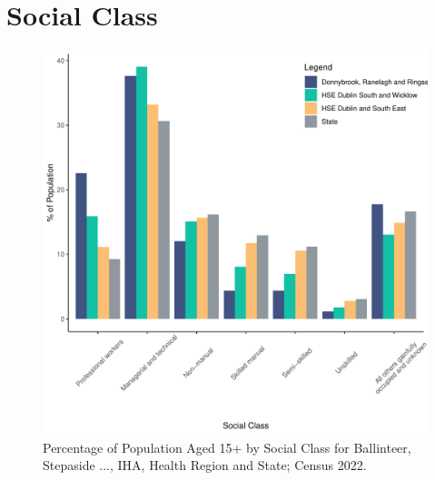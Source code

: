 \documentclass{article}
\begin{document}
\section{Social Class}\label{sect:SC}
\begin{figure}[H]
	\centering
	\includegraphics[width = 140mm]{../figures/SocialClassED.pdf}
	\caption{Percentage of Population Aged 15+ by Social Class for Ballinteer, Stepaside ..., IHA, Health Region and State; Census 2022.}
	\label{fig:vbnv}
	\end{figure}
\end{document}

